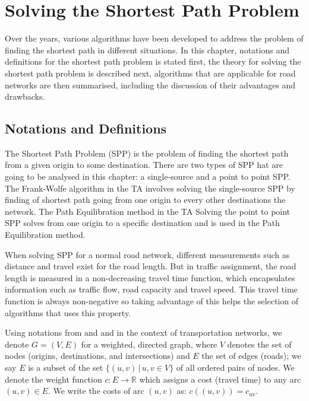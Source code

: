 \chapter{Solving the Shortest Path Problem}
\label{chap:solvingspp}

Over the years,
various algorithms have been developed 
to address the problem of finding the shortest path in different situations.
In this chapter,
notations and definitions for the shortest path problem is stated first, 
the theory for solving the shortest path problem is described next,
algorithms that are applicable for road networks are then summarised,
including the discussion of their advantages and drawbacks.


\section{Notations and Definitions}
The Shortest Path Problem (SPP) is the problem of finding the shortest path from a given origin  to some destination.
There are two types of SPP hat are going to
be analysed in this chapter:
a single-source and a point to point SPP.  
The Frank-Wolfe algorithm in the TA involves
solving the single-source SPP by finding of shortest path going from one origin to every other destinations the network.
The Path Equilibration method in the TA
Solving the point to point SPP solves from one origin to a specific destination and is used in the Path Equilibration method. 

When solving SPP for a normal road network,
different measurements such as distance and travel exist for the road length.
But in traffic assignment,
the road length is measured in a non-decreasing travel time function,
which encapsulates information such as traffic flow, road capacity and travel speed.
This travel time function is always non-negative so taking advantage of this helps the selection of algorithms that uses this property.

Using notations from \citet{Cormen} and \citet{Klunder} and in the context
of transportation networks,
we denote $ G = ( V, E ) $ for a weighted, directed graph,
where $ V $ denotes the set of nodes (origins, destinations, and intersections)
and $ E $ the set of edges (roads);
we say $ E $ is a subset of the set $ \{ (u, v)\, | \, u, v \in V \} $ of all ordered pairs of nodes.
We denote the weight function $ c : E \rightarrow \mathbb{R} $ which assigns a cost (travel time) to any arc $ (u,v) \in E $.
We write the costs of arc $(u, v)$ as: $ c((u, v)) = c_{uv} $.

